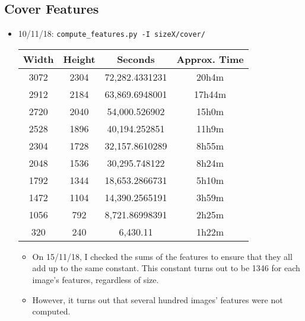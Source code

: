 \documentclass[11pt,a4paper]{report}
\begin{document}
\subsection{Cover Features}
\begin{itemize}
\item 10/11/18: \texttt{compute\_features.py -I sizeX/cover/}
  \begin{center}
  \begin{tabular}{ c c | c c }
  Width & Height & Seconds & Approx. Time \\ \hline
  3072 & 2304 & 72,282.4331231 & 20h4m \\
  2912 & 2184 & 63,869.6948001 & 17h44m \\
  2720 & 2040 & 54,000.526902 & 15h0m \\
  2528 & 1896 & 40,194.252851 & 11h9m \\
  2304 & 1728 & 32,157.8610289 & 8h55m \\
  2048 & 1536 & 30,295.748122 & 8h24m \\
  1792 & 1344 & 18,653.2866731 & 5h10m \\
  1472 & 1104 & 14,390.2565191 & 3h59m \\
  1056 & 792 & 8,721.86998391 & 2h25m \\
  320 & 240 & 6,430.11 & 1h22m \\
  \end{tabular}
  \end{center}

  \begin{itemize}
  \item On 15/11/18, I checked the sums of the features to ensure that they all add up to the same constant. This constant turns out to be 1346 for each image's features, regardless of size.
  \item However, it turns out that several hundred images' features were not computed.
  \end{itemize}


\end{itemize}
\end{document}
